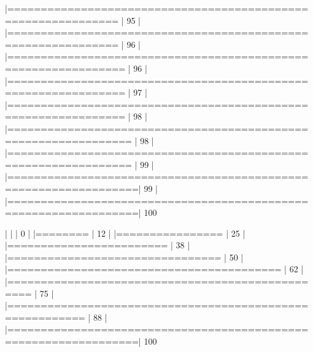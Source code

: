 \documentclass[10pt]{article}
\newenvironment{CodeChunk}{}{}
\begin{document}
\begin{CodeChunk}
\begin{CodeChunk}
\begin{CodeOutput}
  |==============================================================   |  95%
  |                                                                       
  |==============================================================   |  96%
  |                                                                       
  |===============================================================  |  96%
  |                                                                       
  |===============================================================  |  97%
  |                                                                       
  |===============================================================  |  98%
  |                                                                       
  |================================================================ |  98%
  |                                                                       
  |================================================================ |  99%
  |                                                                       
  |=================================================================|  99%
  |                                                                       
  |=================================================================| 100%

  |                                                                       
  |                                                                 |   0%
  |                                                                       
  |========                                                         |  12%
  |                                                                       
  |================                                                 |  25%
  |                                                                       
  |========================                                         |  38%
  |                                                                       
  |================================                                 |  50%
  |                                                                       
  |=========================================                        |  62%
  |                                                                       
  |=================================================                |  75%
  |                                                                       
  |=========================================================        |  88%
  |                                                                       
  |=================================================================| 100%


\end{CodeOutput}
\end{CodeChunk}
\end{CodeChunk}
\end{document}
